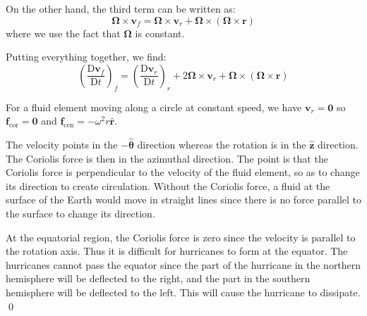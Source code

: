 \documentclass[12pt]{article}
\begin{document}
On the other hand, the third term can be written as:
\begin{equation}
    \mathbf{\Omega} \times \mathbf{v}_{f} = \mathbf{\Omega} \times \mathbf{v}_{r} + \mathbf{\Omega} \times (\mathbf{\Omega} \times \mathbf{r})
\end{equation}
where we use the fact that $\mathbf{\Omega}$ is constant.

Putting everything together, we find:
\begin{equation}
    \left( \frac{\mathrm{D} \mathbf{v}_{f}}{\mathrm{D} t} \right)_{f} = \left( \frac{\mathrm{D} \mathbf{v}_{r}}{\mathrm{D} t} \right)_{r} + 2 \mathbf{\Omega} \times \mathbf{v}_{r} + \mathbf{\Omega} \times (\mathbf{\Omega} \times \mathbf{r})
\end{equation}

For a fluid element moving along a circle at constant speed, we have $\mathbf{v}_{r} = \mathbf{0}$ so $\mathbf{f}_{\text{cor}} = \mathbf{0}$ and $\mathbf{f}_{\text{cen}} = -\omega^{2} r \hat{\mathbf{r}}$.

The velocity points in the $-\hat{\mathbf{\theta}}$ direction whereas the rotation is in the $\hat{\mathbf{z}}$ direction. The Coriolis force is then in the azimuthal direction. The point is that the Coriolis force is perpendicular to the velocity of the fluid element, so as to change its direction to create circulation. Without the Coriolis force, a fluid at the surface of the Earth would move in straight lines since there is no force parallel to the surface to change its direction.

At the equatorial region, the Coriolis force is zero since the velocity is parallel to the rotation axis. Thus it is difficult for hurricanes to form at the equator. The hurricanes cannot pass the equator since the part of the hurricane in the northern hemisphere will be deflected to the right, and the part in the southern hemisphere will be deflected to the left. This will cause the hurricane to dissipate.
\qed


\end{document}
